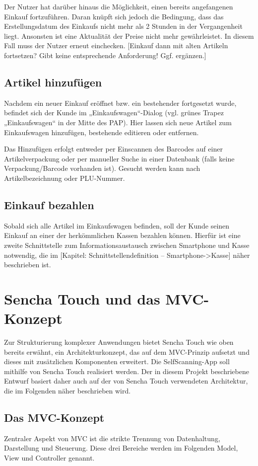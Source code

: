 Der Nutzer hat darüber hinaus die Möglichkeit, einen bereits angefangenen Einkauf fortzuführen. Daran knüpft sich jedoch die Bedingung, dass das Erstellungsdatum des Einkaufs nicht mehr als 2 Stunden in der Vergangenheit liegt. Ansonsten ist eine Aktualität der Preise nicht mehr gewährleistet. In diesem Fall muss der Nutzer erneut einchecken. [Einkauf dann mit alten Artikeln fortsetzen? Gibt keine entsprechende Anforderung! Ggf. ergänzen.]

\subsection{Artikel hinzufügen}
Nachdem ein neuer Einkauf eröffnet bzw. ein bestehender fortgesetzt wurde, befindet sich der Kunde im „Einkaufswagen“-Dialog (vgl. grünes Trapez „Einkaufswagen“ in der Mitte des PAP). Hier lassen sich neue Artikel zum Einkaufswagen hinzufügen, bestehende editieren oder entfernen.

Das Hinzufügen erfolgt entweder per Einscannen des Barcodes auf einer Artikelverpackung oder per manueller Suche in einer Datenbank (falls keine Verpackung/Barcode vorhanden ist). Gesucht werden kann nach Artikelbezeichnung oder PLU-Nummer.

\subsection{Einkauf bezahlen}
Sobald sich alle Artikel im Einkaufswagen befinden, soll der Kunde seinen Einkauf an einer der herkömmlichen Kassen bezahlen können. Hierfür ist eine zweite Schnittstelle zum Informationsaustausch zwischen Smartphone und Kasse notwendig, die im [Kapitel: Schnittstellendefinition – Smartphone->Kasse] näher beschrieben ist.

\section{Sencha Touch und das MVC-Konzept}
Zur Strukturierung komplexer Anwendungen bietet Sencha Touch wie oben bereits erwähnt, ein Architekturkonzept, das auf dem MVC-Prinzip aufsetzt und dieses mit zusätzlichen Komponenten erweitert. Die SelfScanning-App soll mithilfe von Sencha Touch realisiert werden. Der in diesem Projekt beschriebene Entwurf basiert daher auch auf der von Sencha Touch verwendeten Architektur, die im Folgenden näher beschrieben wird.

\subsection{Das MVC-Konzept}
Zentraler Aspekt von MVC ist die strikte Trennung von Datenhaltung, Darstellung und Steuerung. Diese drei Bereiche werden im Folgenden Model, View und Controller genannt.

